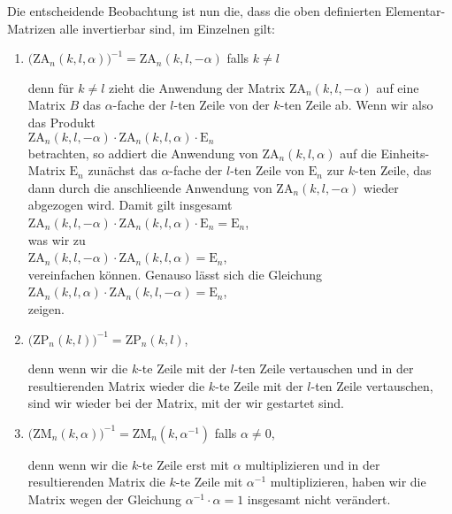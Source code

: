 Die entscheidende Beobachtung ist nun die, dass die oben definierten Elementar-Matrizen alle  invertierbar sind, im Einzelnen gilt:
\begin{enumerate}
\item $\bigl(\mathrm{ZA}_n(k,l,\alpha)\bigr)^{-1} =  \mathrm{ZA}_n(k,l,-\alpha)$  \quad falls $k \not= l$

      denn f\"{u}r $k \not= l$ zieht die Anwendung der Matrix $\mathrm{ZA}_n(k,l,-\alpha)$ auf eine
      Matrix $B$ das $\alpha$-fache der $l$-ten Zeile von der $k$-ten Zeile ab.  Wenn wir also das Produkt
      \\[0.2cm]
      \hspace*{1.3cm}
      $\mathrm{ZA}_n(k,l,-\alpha) \cdot \mathrm{ZA}_n(k,l,\alpha) \cdot \mathrm{E}_n$
      \\[0.2cm]
      betrachten, so addiert die Anwendung von $\mathrm{ZA}_n(k ,l,\alpha)$ auf die
      Einheits-Matrix $\mathrm{E}_n$ zun\"{a}chst das $\alpha$-fache der $l$-ten Zeile von 
      $\mathrm{E}_n$ zur $k$-ten Zeile, das dann durch die anschlie\3ende Anwendung von 
      $\mathrm{ZA}_n(k,l,-\alpha)$ wieder abgezogen wird.  Damit gilt insgesamt
      \\[0.2cm]
      \hspace*{1.3cm}
      $\mathrm{ZA}_n(k,l,-\alpha) \cdot \mathrm{ZA}_n(k,l,\alpha) \cdot \mathrm{E}_n = \mathrm{E}_n$,
      \\[0.2cm]
      was wir zu
      \\[0.2cm]
      \hspace*{1.3cm}
      $\mathrm{ZA}_n(k,l,-\alpha) \cdot \mathrm{ZA}_n(k,l,\alpha) = \mathrm{E}_n$,
      \\[0.2cm]
      vereinfachen k\"{o}nnen.  Genauso l\"{a}sst sich die Gleichung
      \\[0.2cm]
      \hspace*{1.3cm}
      $\mathrm{ZA}_n(k,l,\alpha) \cdot \mathrm{ZA}_n(k,l,-\alpha) = \mathrm{E}_n$,
      \\[0.2cm]
      zeigen.
\item $\bigl(\mathrm{ZP}_n(k,l)\bigr)^{-1} = \mathrm{ZP}_n(k,l)$,

      denn wenn wir die $k$-te Zeile mit der $l$-ten Zeile vertauschen und in der resultierenden
      Matrix wieder die $k$-te Zeile mit der $l$-ten Zeile vertauschen, sind wir wieder bei der
      Matrix, mit der wir gestartet sind.
\item $\bigl(\mathrm{ZM}_n(k,\alpha)\bigr)^{-1} = \mathrm{ZM}_n(k,\alpha^{-1})$ \quad falls $\alpha \not= 0$,

      denn wenn wir die $k$-te Zeile erst mit $\alpha$ multiplizieren und in der resultierenden
      Matrix  die $k$-te Zeile mit $\alpha^{-1}$ multiplizieren, haben wir die Matrix wegen der
      Gleichung  $\alpha^{-1} \cdot \alpha = 1$ insgesamt nicht ver\"{a}ndert.  
\end{enumerate}


